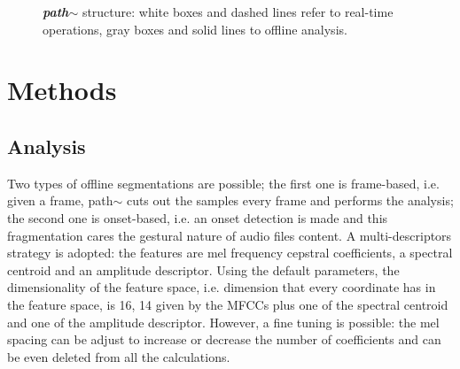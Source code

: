 \documentclass[a0,portrait]{a0poster}
\begin{document}
\begin{multicols}{2}
\begin{figure}[H]
	\caption*{\color{DarkSlateGray}\textbf{\emph{path$\sim$}} structure: \newline
	white boxes and dashed lines refer to real-time operations, \newline 
	gray boxes and solid lines to offline analysis.}
\label{tikz:arch}
\end{figure}

\section*{Methods}
\subsection*{Analysis}
Two types of offline segmentations are possible; the first one is frame-based, i.e. given a frame, path$\sim$ cuts out the samples every frame and performs the analysis; the second one is onset-based, i.e. an onset detection is made and this fragmentation cares the gestural nature of audio files content. A multi-descriptors strategy is adopted: the features are mel frequency cepstral coefficients, a spectral centroid and an amplitude descriptor. Using the default parameters, the dimensionality of the feature space, i.e. dimension that every coordinate has in the feature space, is 16, 14 given by the MFCCs plus one of the spectral centroid and one of the amplitude descriptor. However, a fine tuning is possible: the mel spacing can be adjust to increase or decrease the number of coefficients and can be even deleted from all the calculations.


\end{multicols}
\end{document}
